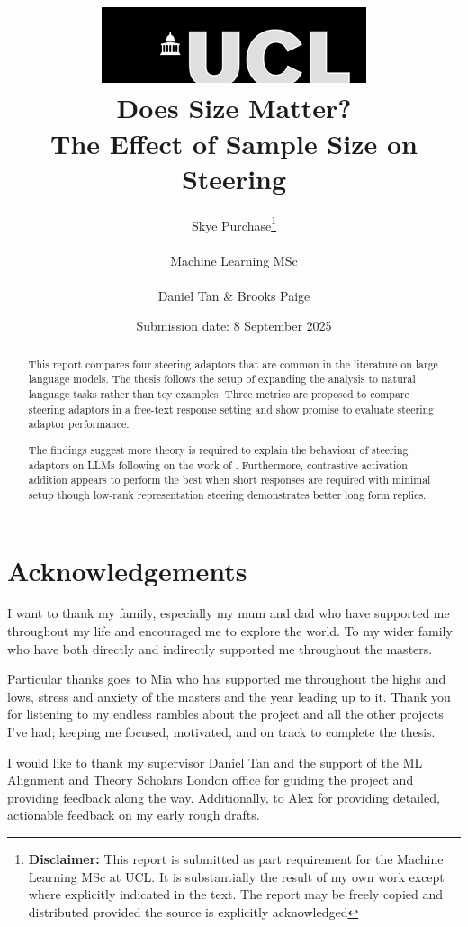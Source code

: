 \documentclass[tikz, 12pt]{report}
\title{{ \includegraphics[scale=.5]{figures/ucl_logo.png}}\\
{{\Huge Does Size Matter?}\\{\Large The Effect of Sample Size on Steering}}\\
}
\date{Submission date: 8 September 2025}
\author{Skye Purchase\thanks{
{\bf Disclaimer:}
This report is submitted as part requirement for the Machine Learning MSc at UCL. It is
substantially the result of my own work except where explicitly indicated in the text.
The report may be freely copied and distributed provided the source is explicitly acknowledged}
\\ \\
Machine Learning MSc\\ \\
Daniel Tan \& Brooks Paige}
\begin{document}



\maketitle

\chapter*{Acknowledgements}

I want to thank my family, especially my mum and dad who have supported me throughout my life and encouraged me to explore the world.
To my wider family who have both directly and indirectly supported me throughout the masters.

Particular thanks goes to Mia who has supported me throughout the highs and lows, stress and anxiety of the masters and the year leading up to it.
Thank you for listening to my endless rambles about the project and all the other projects I've had; keeping me focused, motivated, and on track to complete the thesis.

I would like to thank my supervisor Daniel Tan and the support of the ML Alignment and Theory Scholars London office for guiding the project and providing feedback along the way.
Additionally, to Alex for providing detailed, actionable feedback on my early rough drafts.

\begin{abstract}
    This report compares four steering adaptors that are common in the literature on large language models.
    The thesis follows the setup of \citet{steering-clear} expanding the analysis to natural language tasks rather than toy examples.
    Three metrics are proposed to compare steering adaptors in a free-text response setting and show promise to evaluate steering adaptor performance.

    The findings suggest more theory is required to explain the behaviour of steering adaptors on LLMs following on the work of \citet{steering-clear}.
    Furthermore, contrastive activation addition \citep{caa} appears to perform the best when short responses are required with minimal setup though low-rank representation steering \citep{steering-clear} demonstrates better long form replies.
\end{abstract}

\tableofcontents
\clearpage
{}









\appendix
{}




\end{document}
